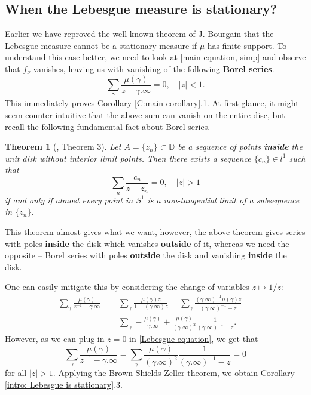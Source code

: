 \documentclass[11pt]{article}
\newtheorem{theorem}{Theorem}[section]
\begin{document}
\subsection{When the Lebesgue measure is stationary?}

Earlier we have reproved the well-known theorem of J. Bourgain that the Lebesgue measure cannot be a stationary measure if $\mu$ has finite support. To understand this case better, we need to look at \eqref{main equation, simp} and observe that $f_\nu$ vanishes, leaving us with vanishing of the following \textbf{Borel series}.
\begin{equation}
	\label{Lebesgue equation}
	\sum_{\gamma} \frac{\mu(\gamma)}{z - \gamma.\infty} = 0, \quad |z| < 1.
\end{equation}
This immediately proves Corollary \ref{C:main corollary}.1. At first glance, it might seem counter-intuitive that the above sum can vanish on the entire disc, but recall the following fundamental fact about Borel series.


\begin{theorem}[\cite{brownsums}, Theorem 3]
	\label{non-tangential equiv rep}
	Let $A = \{ z_n \} \subset \mathbb{D}$ be a sequence of points \textbf{inside} the unit disk without interior limit points. Then there exists a sequence $\{c_n\} \in l^1$ such that
	\[
	\sum_n \frac{c_n}{z - z_n} = 0, \quad |z| > 1
	\]
	if and only if almost every point in $S^1$ is a non-tangential limit of a subsequence in $\{z_n\}$.
\end{theorem}

This theorem almost gives what we want, however, the above theorem gives series with poles \textbf{inside} the disk which vanishes \textbf{outside} of it, whereas we need the opposite -- Borel series with poles \textbf{outside} the disk and vanishing \textbf{inside} the disk.

One can easily mitigate this by considering the change of variables $z \mapsto 1/z$:
\[
\begin{aligned}
	\sum_{\gamma} \frac{\mu(\gamma)}{z^{-1} - \gamma.\infty} &= \sum_{\gamma} \frac{\mu(\gamma) z}{1 - (\gamma.\infty) z} = \sum_{\gamma} \frac{(\gamma.\infty)^{-1}  \mu(\gamma) z}{(\gamma.\infty)^{-1} -  z} = \\ 
	&= \sum_{\gamma} - \frac{\mu(\gamma)}{\gamma.\infty} + \frac{\mu(\gamma)}{(\gamma.\infty)^2} \frac{1}{(\gamma.\infty)^{-1} - z}.
\end{aligned}
\]
However, as we can plug in $z = 0$ in \eqref{Lebesgue equation}, we get that
\[
\sum_{\gamma} \frac{\mu(\gamma)}{z^{-1} - \gamma.\infty} = \sum_{\gamma}\frac{\mu(\gamma)}{(\gamma.\infty)^2} \frac{1}{(\gamma.\infty)^{-1} - z} = 0
\]
for all $|z| > 1$. Applying the Brown-Shields-Zeller theorem, we obtain Corollary \ref{intro: Lebesgue is stationary}.3.
\end{document}
